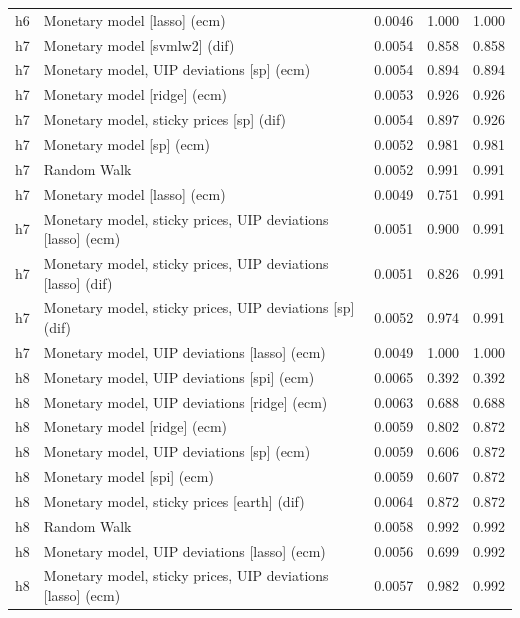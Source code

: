 \begin{ThreePartTable}
\begin{longtable}[t]{cp{5.5cm}ccc}
h6 & \raggedright Monetary model [lasso] (ecm) & 0.0046 & 1.000 & 1.000\\
\addlinespace
h7 & \raggedright Monetary model [svmlw2] (dif) & 0.0054 & 0.858 & 0.858\\
h7 & \raggedright Monetary model, UIP deviations [sp] (ecm) & 0.0054 & 0.894 & 0.894\\
h7 & \raggedright Monetary model [ridge] (ecm) & 0.0053 & 0.926 & 0.926\\
h7 & \raggedright Monetary model, sticky prices [sp] (dif) & 0.0054 & 0.897 & 0.926\\
h7 & \raggedright Monetary model [sp] (ecm) & 0.0052 & 0.981 & 0.981\\
h7 & \raggedright Random Walk & 0.0052 & 0.991 & 0.991\\
h7 & \raggedright Monetary model [lasso] (ecm) & 0.0049 & 0.751 & 0.991\\
h7 & \raggedright Monetary model, sticky prices, UIP deviations [lasso] (ecm) & 0.0051 & 0.900 & 0.991\\
h7 & \raggedright Monetary model, sticky prices, UIP deviations [lasso] (dif) & 0.0051 & 0.826 & 0.991\\
h7 & \raggedright Monetary model, sticky prices, UIP deviations [sp] (dif) & 0.0052 & 0.974 & 0.991\\
h7 & \raggedright Monetary model, UIP deviations [lasso] (ecm) & 0.0049 & 1.000 & 1.000\\
\addlinespace
h8 & \raggedright Monetary model, UIP deviations [spi] (ecm) & 0.0065 & 0.392 & 0.392\\
h8 & \raggedright Monetary model, UIP deviations [ridge] (ecm) & 0.0063 & 0.688 & 0.688\\
h8 & \raggedright Monetary model [ridge] (ecm) & 0.0059 & 0.802 & 0.872\\
h8 & \raggedright Monetary model, UIP deviations [sp] (ecm) & 0.0059 & 0.606 & 0.872\\
h8 & \raggedright Monetary model [spi] (ecm) & 0.0059 & 0.607 & 0.872\\
h8 & \raggedright Monetary model, sticky prices [earth] (dif) & 0.0064 & 0.872 & 0.872\\
h8 & \raggedright Random Walk & 0.0058 & 0.992 & 0.992\\
h8 & \raggedright Monetary model, UIP deviations [lasso] (ecm) & 0.0056 & 0.699 & 0.992\\
h8 & \raggedright Monetary model, sticky prices, UIP deviations [lasso] (ecm) & 0.0057 & 0.982 & 0.992\\

\end{longtable}
\end{ThreePartTable}
